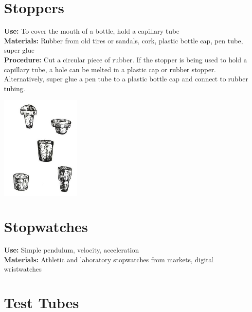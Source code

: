 \begin{multicols}{2}
\section{Stoppers}
\label{sec:stoppers}
\vspace{-10pt}
\textbf{Use:} To cover the mouth of a bottle, hold a capillary tube\\
\textbf{Materials:} Rubber from old tires or sandals, cork, plastic bottle cap, pen tube, super glue\\
\textbf{Procedure:} Cut a circular piece of rubber.  If the stopper is being used to hold a capillary tube, a hole can be melted in a plastic cap or rubber stopper. Alternatively, super glue a pen tube to a plastic bottle cap and connect to rubber tubing.
\begin{center}
\includegraphics[width=0.3\textwidth]{./img/source/stoppers.jpg}
\end{center}

\section{Stopwatches}
\label{sec:stopwatches}
\vspace{-10pt}
\textbf{Use:} Simple pendulum, velocity, acceleration\\
\textbf{Materials:} Athletic and laboratory stopwatches from markets, digital wristwatches

\columnbreak

\section{Test Tubes}
\label{sec:testtubes}


\end{multicols}
